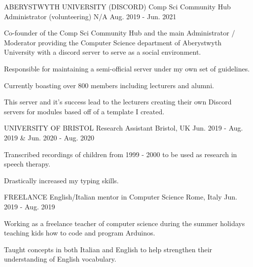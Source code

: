 \begin{cventries}
  \cventry
    {ABERYSTWYTH UNIVERSITY (DISCORD)} %
    {Comp Sci Community Hub Administrator (volunteering)} %
    {N/A} %
    {Aug. 2019 - Jun. 2021} %
    {
      \begin{cvitems} %
        \item {Co-founder of the Comp Sci Community Hub and the main Administrator / Moderator providing the Computer Science department of Aberystwyth University with a discord server to serve as a social environment.}
        \item {Responsible for maintaining a semi-official server under my own set of guidelines.}
        \item {Currently boasting over 800 members including lecturers and alumni.}
        \item {This server and it's success lead to the lecturers creating their own Discord servers for modules based off of a template I created.}
      \end{cvitems}
    }
    
  \cventry
    {UNIVERSITY OF BRISTOL} %
    {Research Assistant} %
    {Bristol, UK} %
    {Jun. 2019 - Aug. 2019 \& Jun. 2020 - Aug. 2020} %
    {
      \begin{cvitems} %
        \item {Transcribed recordings of children from 1999 - 2000 to be used as research in speech therapy.}
        \item {Drastically increased my typing skills.}
      \end{cvitems}
    }
    

  \cventry
    {FREELANCE} %
    {English/Italian mentor in Computer Science} %
    {Rome, Italy} %
    {Jun. 2019 - Aug. 2019} %
    {
      \begin{cvitems} %
        \item {Working as a freelance teacher of computer science during the summer holidays teaching kids how to code and program Arduinos.}
        \item {Taught concepts in both Italian and English to help strengthen their understanding of English vocabulary.}
      \end{cvitems}
    }

\end{cventries}
